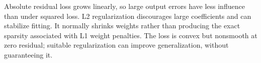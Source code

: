 Absolute residual loss grows linearly, so large output errors have less influence than under squared loss. L2 regularization discourages large coefficients and can stabilize fitting. It normally shrinks weights rather than producing the exact sparsity associated with L1 weight penalties. The loss is convex but nonsmooth at zero residual; suitable regularization can improve generalization, without guaranteeing it.
